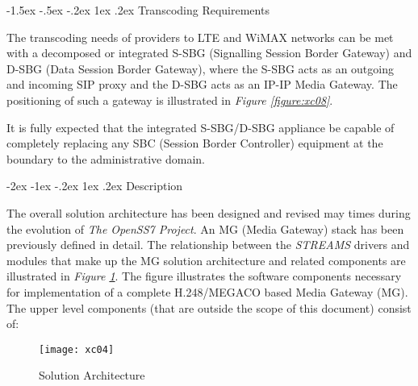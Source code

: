 \documentclass[letterpaper,final,notitlepage,twocolumn,10pt,twoside]{article}
\makeatletter
\let\large = \normalsize
\let\normalsize = \small
\let\small = \footnotesize
\let\footnotesize = \scriptsize
\let\scriptsize = \tiny
\renewcommand\section{\@startsection {section}{1}{\z@}%
                                   {-2ex \@plus -1ex \@minus -.2ex}%
                                   {1ex \@plus .2ex}%
                                   {\normalfont\large\bfseries}}
\renewcommand\subsection{\@startsection{subsection}{2}{\z@}%
                                     {-1.5ex \@plus -.5ex \@minus -.2ex}%
                                     {1ex \@plus .2ex}%
                                     {\normalfont\normalsize\bfseries}}
\makeatother
\begin{document}
\subsection{Transcoding Requirements}

The transcoding needs of providers to LTE and WiMAX networks can be met with a
decomposed or integrated S-SBG (Signalling Session Border Gateway) and D-SBG
(Data Session Border Gateway), where the S-SBG acts as an outgoing and incoming
SIP proxy and the D-SBG acts as an IP-IP Media Gateway.  The positioning of such
a gateway is illustrated in \textsl{Figure \ref{figure:xc08}}.

It is fully expected that the integrated S-SBG/D-SBG appliance be capable of
completely replacing any SBC (Session Border Controller) equipment at the
boundary to the administrative domain.

\section{Description}

The overall solution architecture has been designed and revised may times during
the evolution of {\sl The OpenSS7 Project}.  An MG (Media Gateway) stack has
been previously defined in detail.  The relationship between the {\sl STREAMS}
drivers and modules that make up the MG solution architecture and related
components are illustrated in {\sl Figure \ref{figure:xc04}}.  The figure
illustrates the software components necessary for implementation of a complete
H.248/MEGACO based Media Gateway (MG).  The upper level components (that are
outside the scope of this document) consist of:

\begin{figure}[htp]
\center\texttt{[image: xc04]}
\caption{Solution Architecture}
\label{figure:xc04}
\end{figure}
\end{document}

